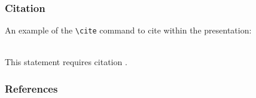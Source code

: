 \documentclass[10pt]{beamer}
\begin{document}
\begin{frame}[fragile] %
\frametitle{Citation}
An example of the \verb|\cite| command to cite within the presentation:\\~

This statement requires citation \cite{figueredo2009}.
\end{frame}


\begin{frame}
\frametitle{References}
\footnotesize{
    \setsansfont{Liberation Serif}
    
}
\end{frame}

\end{document}
